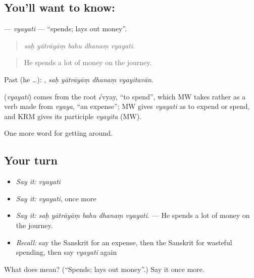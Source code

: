\subsection*{You'll want to know: }
\textbf{} — \emph{vyayati} — \textquotedblleft{}spends; lays out money\textquotedblright{}.

\begin{quote}
    
\end{quote}

\begin{quote}
\emph{saḥ yātrāyāṃ bahu dhanaṃ vyayati.}
\end{quote}

\begin{quote}
He spends a lot of money on the journey.
\end{quote}

Past (he …):    , \emph{saḥ yātrāyāṃ dhanaṃ vyayitavān}.

\begin{cousinweb}
\textbf{} (\emph{vyayati}) comes from the root √vyay, \textquotedblleft{}to spend\textquotedblright{}, which MW takes rather as a verb made from \emph{vyaya}, \textquotedblleft{}an expense\textquotedblright{}; MW gives \emph{vyayati} as to expend or spend, and KRM gives its participle \emph{vyayita} (MW).
\end{cousinweb}

\begin{grammarlens}[title={What you've built}]
One more word for getting around.
\end{grammarlens}

\subsection*{Your turn}
\begin{itemize}
\raggedright
  \item \emph{Say it:} \emph{vyayati}
  \item \emph{Say it:} \emph{vyayati}, once more
  \item \emph{Say it:} \emph{saḥ yātrāyāṃ bahu dhanaṃ vyayati.} — He spends a lot of money on the journey.
  \item \emph{Recall:} say the Sanskrit for an expense, then the Sanskrit for wasteful spending, then say \emph{vyayati} again
\end{itemize}

\begin{tcolorbox}[breakable,colback=teal!4,colframe=teal!35!black,title={Before you move on}]
What does  mean? (\textquotedblleft{}Spends; lays out money\textquotedblright{}.) Say it once more.
\end{tcolorbox}
